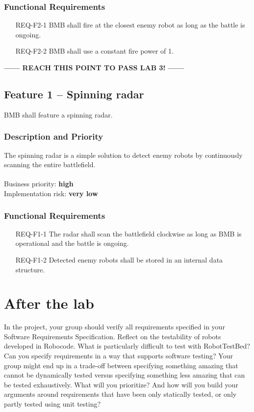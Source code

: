 \documentclass{scrreprt}
\begin{document}
\subsection{Functional Requirements}
\begin{itemize}
\item[REQ-F2-1] BMB shall fire at the closest enemy robot as long as the battle is ongoing.
\item[REQ-F2-2] BMB shall use a constant fire power of 1.
\end{itemize}

\begin{center}
\textbf{------ REACH THIS POINT TO PASS LAB 3! ------}
\end{center}

\section{Feature 1 -- Spinning radar}
BMB shall feature a spinning radar.

\subsection{Description and Priority}
The spinning radar is a simple solution to detect enemy robots by continuously scanning the entire battlefield.\\\\Business priority: \textbf{high}\\
Implementation risk: \textbf{very low}

\subsection{Functional Requirements}
\begin{itemize}
\item[REQ-F1-1] The radar shall scan the battlefield clockwise as long as BMB is operational and the battle is ongoing.
\item[REQ-F1-2] Detected enemy robots shall be stored in an internal data structure. 
\end{itemize}

\chapter{After the lab}
In the project, your group should verify all requirements specified in your Software Requirements Specification. Reflect on the testability of robots developed in Robocode. What is particularly difficult to test with RobotTestBed? Can you specify requirements in a way that supports software testing? Your group might end up in a trade-off between specifying something amazing that cannot be dynamically  tested versus specifying something less amazing that can be tested exhaustively. What will you prioritize? And how will you build your arguments around requirements that have been only statically tested, or only partly tested using unit testing?
\end{document}
